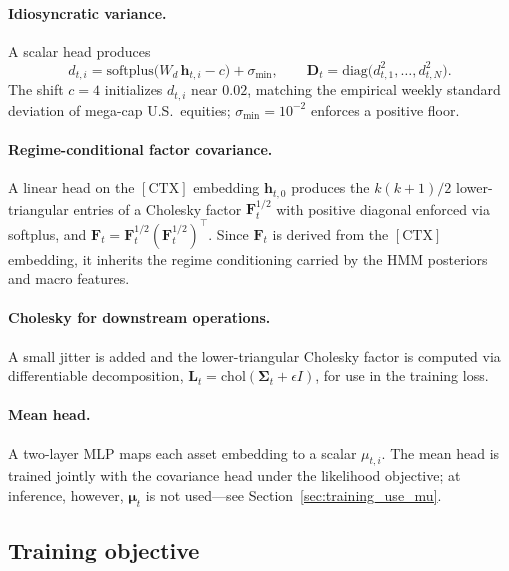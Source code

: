 \documentclass[11pt]{article}
\newcommand{\diag}{\mathrm{diag}}
\newcommand{\CTX}{[\mathrm{CTX}]}
\newcommand{\Sig}{\boldsymbol{\Sigma}}
\newcommand{\bmu}{\boldsymbol{\mu}}
\newcommand{\bL}{\mathbf{L}}
\newcommand{\bF}{\mathbf{F}}
\newcommand{\bD}{\mathbf{D}}
\newcommand{\softplus}{\mathrm{softplus}}
\begin{document}
\paragraph{Idiosyncratic variance.} A scalar head produces
\begin{equation}
d_{t,i} = \softplus\bigl(W_d\, \mathbf{h}_{t,i} - c\bigr) + \sigma_{\min},
\qquad
\bD_t = \diag\bigl(d_{t,1}^2,\ldots,d_{t,N}^2\bigr).
\end{equation}
The shift $c = 4$ initializes $d_{t,i}$ near $0.02$, matching the
empirical weekly standard deviation of mega-cap U.S.\ equities;
$\sigma_{\min} = 10^{-2}$ enforces a positive floor.

\paragraph{Regime-conditional factor covariance.} A linear head on the
$\CTX$ embedding $\mathbf{h}_{t,0}$ produces the $k(k{+}1)/2$
lower-triangular entries of a Cholesky factor $\bF_t^{1/2}$ with positive
diagonal enforced via softplus, and $\bF_t = \bF_t^{1/2}(\bF_t^{1/2})^\top$.
Since $\bF_t$ is derived from the $\CTX$ embedding, it inherits the
regime conditioning carried by the HMM posteriors and macro features.

\paragraph{Cholesky for downstream operations.} A small jitter is added
and the lower-triangular Cholesky factor is computed via differentiable
decomposition, $\bL_t = \mathrm{chol}(\Sig_t + \epsilon I)$, for use in
the training loss.

\paragraph{Mean head.} A two-layer MLP maps each asset embedding to a
scalar $\mu_{t,i}$. The mean head is trained jointly with the
covariance head under the likelihood objective; at inference, however,
$\bmu_t$ is not used---see Section~\ref{sec:training_use_mu}.

\subsection{Training objective}\label{sec:loss}
\end{document}
